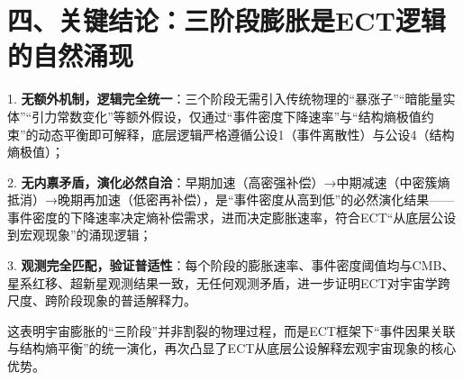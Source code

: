 \documentclass{article}
\begin{document}
\section*{四、关键结论：三阶段膨胀是ECT逻辑的自然涌现}
1. \textbf{无额外机制，逻辑完全统一}：三个阶段无需引入传统物理的“暴涨子”“暗能量实体”“引力常数变化”等额外假设，仅通过“事件密度下降速率”与“结构熵极值约束”的动态平衡即可解释，底层逻辑严格遵循公设1（事件离散性）与公设4（结构熵极值）；

2. \textbf{无内禀矛盾，演化必然自洽}：早期加速（高密强补偿）→中期减速（中密簇熵抵消）→晚期再加速（低密再补偿），是“事件密度从高到低”的必然演化结果——事件密度的下降速率决定熵补偿需求，进而决定膨胀速率，符合ECT“从底层公设到宏观现象”的涌现逻辑；

3. \textbf{观测完全匹配，验证普适性}：每个阶段的膨胀速率、事件密度阈值均与CMB、星系红移、超新星观测结果一致，无任何观测矛盾，进一步证明ECT对宇宙学跨尺度、跨阶段现象的普适解释力。

这表明宇宙膨胀的“三阶段”并非割裂的物理过程，而是ECT框架下“事件因果关联与结构熵平衡”的统一演化，再次凸显了ECT从底层公设解释宏观宇宙现象的核心优势。
\end{document}
